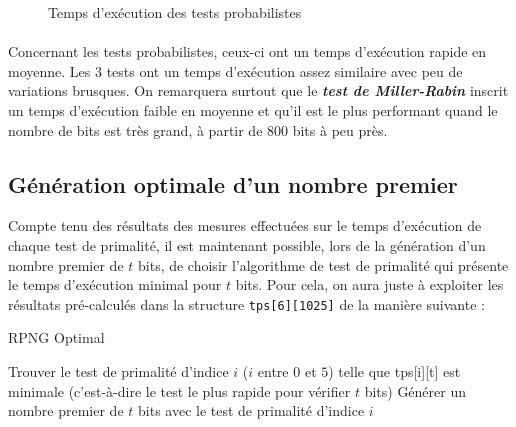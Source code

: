 			\begin{figure}[H]\vspace{-1em}\caption{Temps d'exécution des tests probabilistes}\label{fig:M5}\end{figure}
			
			\paragraph{} Concernant les tests probabilistes, ceux-ci ont un temps d'exécution rapide en moyenne. Les 3 tests ont un temps d'exécution assez similaire avec peu de variations brusques. On remarquera surtout que le \textit{\textbf{test de Miller-Rabin}} inscrit un temps d'exécution faible en moyenne et qu'il est le plus performant quand le nombre de bits est très grand, à partir de 800 bits à peu près.

		
	\subsection{Génération optimale d'un nombre premier}
		Compte tenu des résultats des mesures effectuées sur le temps d'exécution de chaque test de primalité, il est maintenant possible, lors de la génération d'un nombre premier de $t$ bits, de choisir l'algorithme de test de primalité qui présente le temps d'exécution minimal pour $t$ bits. Pour cela, on aura juste à exploiter les résultats pré-calculés dans la structure \lstinline!tps[6][1025]! de la manière suivante :\\
			
			\begin{algorithm}[H]
				\caption{RPNG Optimal}\label{RPNG_opt}
				Trouver le test de primalité d'indice $i$ ($i$ entre $0$ et $5$) telle que tps[i][t] est minimale (c'est-à-dire le test le plus rapide pour vérifier $t$ bits)\;
				Générer un nombre premier de $t$ bits avec le test de primalité d'indice $i$\;
			\end{algorithm}
			~\\

